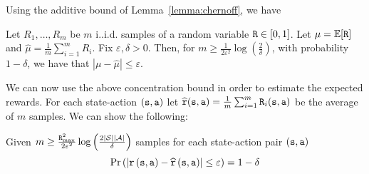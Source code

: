 Using the additive bound of Lemma~\ref{lemma:chernoff}, we have
\begin{corollary}
\label{cor:chernoff}
 Let $R_1, \ldots, R_m$ be $m$
i..i.d. samples of a random variable ${\tt R}\in[0,1]$. Let
$\mu=\mathbb{E}[{\tt R}]$ and $\widehat{\mu}=\frac{1}{m}\sum_{i=1}^m R_i$.
Fix $\varepsilon,\delta>0$. Then, for $m\geq
\frac{1}{2\varepsilon^2}\log (\frac{2}{\delta})$, with probability
$1-\delta$, we have that $|\mu-\widehat{\mu}|\leq \varepsilon$.
\end{corollary}


We can now use the above concentration bound in order to estimate
the expected rewards. For each state-action $({\tt s},{\tt a})$ let
$\widehat{{\tt r}}({\tt s},{\tt a})=\frac{1}{m}\sum_{i=1}^m
{\tt R}_i({\tt s},{\tt a})$ be the average of $m$ samples. We can
show the following:

\begin{claim}
\label{claim:sample}
Given $m\geq\frac{{\tt R}_{\max }^{2}}{2\varepsilon^{2}}\log\left(\frac{2\left|\mathcal{S}\right|\left|\mathcal{A}\right|}{\delta}\right)$
samples for each state-action pair $\left({\tt s},{\tt a}\right)$
\[
\Pr\left(\left|{\tt r}\left({\tt s},{\tt a}\right)-\widehat{{\tt r}}\left({\tt s},{\tt a}\right)\right|\leq\varepsilon\right)=1-\delta
\]
\end{claim}

